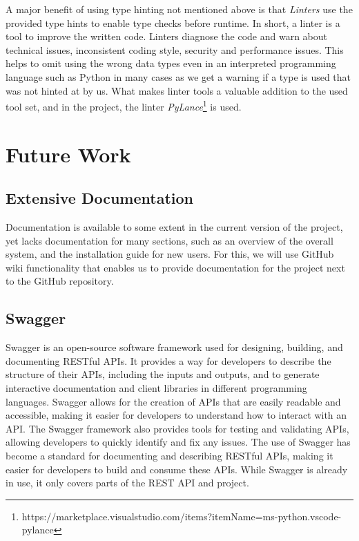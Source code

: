 \documentclass{article}
\begin{document}
        A major benefit of using type hinting not mentioned above is that \emph{Linters} use the provided type hints to enable type checks before runtime. 
        In short, a linter is a tool to improve the written code. Linters diagnose the code and warn about technical issues, inconsistent coding style, security and performance issues. This helps to omit using the wrong data types even in an interpreted programming language such as Python in many cases as we get a warning if a type is used that was not hinted at by us.
        What makes linter tools a valuable addition to the used tool set, and in the project, the linter \emph{PyLance}\footnote{https://marketplace.visualstudio.com/items?itemName=ms-python.vscode-pylance} is used. 

        
    \section{Future Work}
    \label{sec:future-work}


        \subsection{Extensive Documentation}
            Documentation is available to some extent in the current version of the project, yet lacks documentation for many sections, such as an overview of the overall system, and the installation guide for new users.
            For this, we will use GitHub wiki functionality that enables us to provide documentation for the project next to the GitHub repository.
            
        \subsection{Swagger}
            Swagger is an open-source software framework used for designing, building, and documenting RESTful APIs. It provides a way for developers to describe the structure of their APIs, including the inputs and outputs, and to generate interactive documentation and client libraries in different programming languages. Swagger allows for the creation of APIs that are easily readable and accessible, making it easier for developers to understand how to interact with an API. The Swagger framework also provides tools for testing and validating APIs, allowing developers to quickly identify and fix any issues. The use of Swagger has become a standard for documenting and describing RESTful APIs, making it easier for developers to build and consume these APIs.
            While Swagger is already in use, it only covers parts of the REST API and project.
\end{document}
